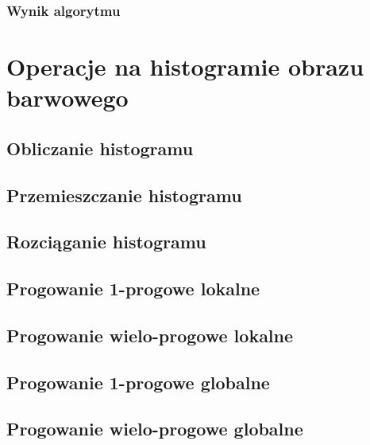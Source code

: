 \documentclass[a4paper,12pt]{book}
\begin{document}
\subsection*{Wynik algorytmu}

\chapter{Operacje na histogramie obrazu barwowego}
\section{Obliczanie histogramu}
\section{Przemieszczanie histogramu}
\section{Rozciąganie histogramu}
\section{Progowanie 1-progowe lokalne}
\section{Progowanie wielo-progowe lokalne}
\section{Progowanie 1-progowe globalne}
\section{Progowanie wielo-progowe globalne}
\end{document}
